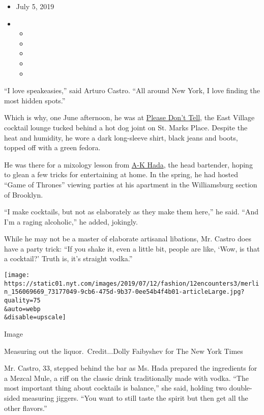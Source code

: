 \begin{itemize}
\item
  July 5, 2019
\item
  \begin{itemize}
  \item
  \item
  \item
  \item
  \item
  \end{itemize}
\end{itemize}

``I love speakeasies,'' said Arturo Castro. ``All around New York, I
love finding the most hidden spots.''

Which is why, one June afternoon, he was at
\href{http://www.pdtnyc.com/}{Please Don't Tell}, the East Village
cocktail lounge tucked behind a hot dog joint on St. Marks Place.
Despite the heat and humidity, he wore a dark long-sleeve shirt, black
jeans and boots, topped off with a green fedora.

He was there for a mixology lesson from
\href{https://www.instagram.com/akhada07/}{A-K Hada}, the head
bartender, hoping to glean a few tricks for entertaining at home. In the
spring, he had hosted ``Game of Thrones'' viewing parties at his
apartment in the Williamsburg section of Brooklyn.

``I make cocktails, but not as elaborately as they make them here,'' he
said. ``And I'm a raging alcoholic,'' he added, jokingly.

While he may not be a master of elaborate artisanal libations, Mr.
Castro does have a party trick: ``If you shake it, even a little bit,
people are like, `Wow, is that a cocktail?' Truth is, it's straight
vodka.''

\texttt{[image: https://static01.nyt.com/images/2019/07/12/fashion/12encounters3/merlin\_156069669\_73177049-9cb6-475d-9b37-0ee54b4f4b01-articleLarge.jpg?quality=75\\\&auto=webp\\\&disable=upscale]}

Image

Measuring out the liquor.~Credit...Dolly Faibyshev for The New York
Times

Mr. Castro, 33, stepped behind the bar as Ms. Hada prepared the
ingredients for a Mezcal Mule, a riff on the classic drink traditionally
made with vodka. ``The most important thing about cocktails is
balance,'' she said, holding two double-sided measuring jiggers. ``You
want to still taste the spirit but then get all the other flavors.''

